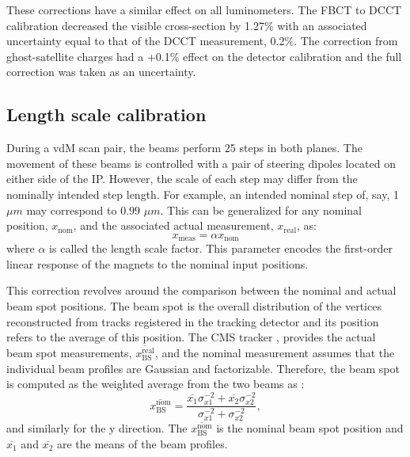 These corrections have a similar effect on all luminometers. The FBCT to DCCT calibration decreased the visible cross-section by 1.27\% with an associated uncertainty equal to that of the DCCT measurement, 0.2\%. The correction from ghost-satellite charges had a +0.1\% effect on the detector calibration and the full correction was taken as an uncertainty.

\subsection{Length scale calibration}

During a vdM scan pair, the beams perform 25 steps in both planes. The movement of these beams is controlled with a pair of steering dipoles located on either side of the IP. However, the scale of each step may differ from the nominally intended step length. For example, an intended nominal step of, say, 1 $\mu m$ may correspond to $0.99$ $\mu m$. This can be generalized for any nominal position, $x_{\mathrm{nom}}$, and the associated actual measurement, $x_{\mathrm{real}}$, as:
\begin{equation}
	x_{\mathrm{meas}} = \alpha x_{\mathrm{nom}}
\end{equation}
where $\alpha$ is called the length scale factor. This parameter encodes the first-order linear response of the magnets to the nominal input positions.

This correction revolves around the comparison between the nominal and actual beam spot positions. The beam spot is the overall distribution of the vertices reconstructed from tracks registered in the tracking detector and its position refers to the average of this position. The CMS tracker \cite{Sirunyan:2759951}, provides the actual beam spot measurements, $\overline{x^{\mathrm{real}}_{\mathrm{BS}}}$, and the nominal measurement assumes that the individual beam profiles are Gaussian and factorizable. Therefore, the beam spot is computed as the weighted average from the two beams as \cite{CMS-PAS-LUM-22-001}:
\begin{equation}
	\overline{x^{\mathrm{nom}}_{\mathrm{BS}}} = \frac{\overline{x_1}\sigma_{x1}^{-2} + \overline{x_2}\sigma_{x2}^{-2}}{\sigma_{x1}^{-2} + \sigma_{x2}^{-2}},
\end{equation}
and similarly for the y direction. The $\overline{x^{\mathrm{nom}}_{\mathrm{BS}}}$ is the nominal beam spot position and $\overline{x_1}$ and $\overline{x_2}$ are the means of the beam profiles.

